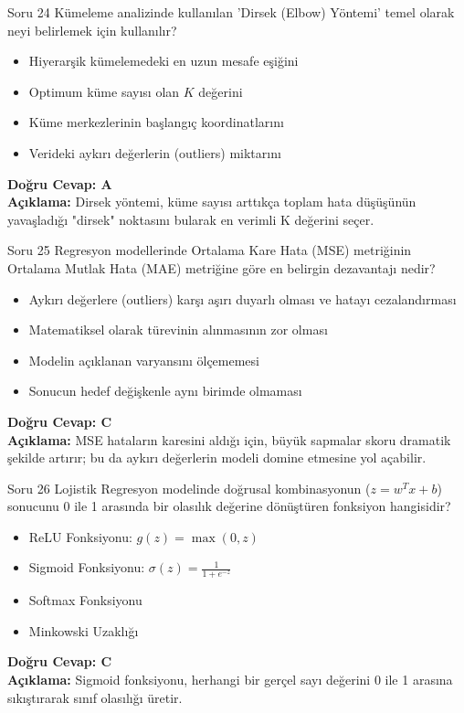 \documentclass[12pt,a4paper]{article}
\begin{document}
\begin{testcard}{Soru 24}
    Kümeleme analizinde kullanılan 'Dirsek (Elbow) Yöntemi' temel olarak neyi belirlemek için kullanılır?
    \begin{itemize}
        \item[A)] Hiyerarşik kümelemedeki en uzun mesafe eşiğini
        \item[B)] Optimum küme sayısı olan $K$ değerini
        \item[C)] Küme merkezlerinin başlangıç koordinatlarını
        \item[D)] Verideki aykırı değerlerin (outliers) miktarını
    \end{itemize}
    \tcblower
    \textbf{Doğru Cevap: A} \\
    \textbf{Açıklama:} Dirsek yöntemi, küme sayısı arttıkça toplam hata düşüşünün yavaşladığı "dirsek" noktasını bularak en verimli K değerini seçer.
\end{testcard}

\begin{testcard}{Soru 25}
    Regresyon modellerinde Ortalama Kare Hata (MSE) metriğinin Ortalama Mutlak Hata (MAE) metriğine göre en belirgin dezavantajı nedir?
    \begin{itemize}
        \item[A)] Aykırı değerlere (outliers) karşı aşırı duyarlı olması ve hatayı cezalandırması
        \item[B)] Matematiksel olarak türevinin alınmasının zor olması
        \item[C)] Modelin açıklanan varyansını ölçememesi
        \item[D)] Sonucun hedef değişkenle aynı birimde olmaması
    \end{itemize}
    \tcblower
    \textbf{Doğru Cevap: C} \\
    \textbf{Açıklama:} MSE hataların karesini aldığı için, büyük sapmalar skoru dramatik şekilde artırır; bu da aykırı değerlerin modeli domine etmesine yol açabilir.
\end{testcard}
\begin{testcard}{Soru 26}
    Lojistik Regresyon modelinde doğrusal kombinasyonun ($z = w^T x + b$) sonucunu 0 ile 1 arasında bir olasılık değerine dönüştüren fonksiyon hangisidir?
    \begin{itemize}
        \item[A)] ReLU Fonksiyonu: $g(z) = \max(0, z)$
        \item[B)] Sigmoid Fonksiyonu: $\sigma(z) = \frac{1}{1 + e^{-z}}$
        \item[C)] Softmax Fonksiyonu
        \item[D)] Minkowski Uzaklığı
    \end{itemize}
    \tcblower
    \textbf{Doğru Cevap: C} \\
    \textbf{Açıklama:} Sigmoid fonksiyonu, herhangi bir gerçel sayı değerini 0 ile 1 arasına sıkıştırarak sınıf olasılığı üretir.
\end{testcard}
\end{document}
